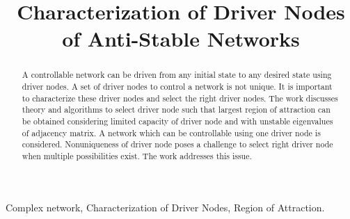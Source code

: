 \documentclass[conference]{IEEEtran}
\begin{document}
\title{Characterization of Driver Nodes of Anti-Stable Networks}


\author{
\and
{}
\and
{}
}













\maketitle


\begin{abstract}
A  controllable  network can  be  driven  from  any  initial  state  to  any  desired  state using driver nodes. A set of driver nodes to control a network is not unique. It is important to characterize these driver nodes and select the right driver nodes. The work discusses theory and algorithms to select driver node such that largest region of attraction can be obtained considering limited capacity of driver node and with unstable eigenvalues of adjacency matrix. A network which can be controllable using one driver node is considered. Nonuniqueness of driver node poses a challenge to select right driver node when multiple possibilities exist. The work addresses this issue.
\end{abstract}

\begin{keywords}
Complex network, Characterization of Driver Nodes, Region of Attraction.
\end{keywords}








\IEEEpeerreviewmaketitle
\end{document}
